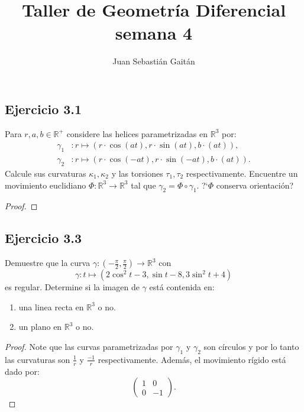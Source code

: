 \documentclass[12pt]{article}
\title{Taller de Geometr\'ia Diferencial semana 4 }
\author{Juan Sebasti\'an Gait\'an}
\begin{document}
\maketitle

\vspace{0.5in}



\subsection*{Ejercicio 3.1}
Para $r,a,b\in \mathbb{R}^{+}$  considere las helices parametrizadas en $\mathbb{R}^{3}$ por:
\begin{equation*}
\begin{split}
\gamma_{1}&: r \mapsto (r \cdot \cos (at), r \cdot \sin (at), b \cdot (at)), \\
\gamma_{2}&: r \mapsto (r \cdot \cos (-at), r \cdot \sin (-at) , b \cdot (at)).
\end{split}
\end{equation*}
Calcule sus curvaturas $\kappa_1 , \kappa_2 $ y las torsiones $\tau_1 , \tau_2$ respectivamente. Encuentre un movimiento euclidiano $\Phi: \mathbb{R}^3 \rightarrow \mathbb{R}^3$ tal que $\gamma_2=\Phi \circ \gamma_1$. ?`$\Phi$ conserva orientaci\'on?
\begin{proof}
\end{proof}



\subsection*{Ejercicio 3.3}
 Demuestre que la curva $\gamma :(-\frac{\pi}{2},\frac{\pi}{2}) \rightarrow \mathbb{R}^3$ con
\begin{equation*}
   \gamma :t \mapsto (2 \cos^2 t -3 , \sin t - 8 , 3 \sin ^2 t + 4)
\end{equation*}
es regular. Determine si la imagen de $\gamma$ est\'a contenida en:
\begin{enumerate}
  \item una linea recta en $\mathbb{R}^3$ o no.
  \item un plano en $\mathbb{R}^3$ o no.
\end{enumerate}


\begin{proof}
Note que las curvas parametrizadas por $\gamma_{1}$ y  $\gamma_{2}$ son c\'irculos y por lo tanto las curvaturas son $\frac{1}{r}$ y $\frac{-1}{r}$ respectivamente. Adem\'as, el movimiento r\'igido est\'a dado por:
\begin{equation*}
\begin{pmatrix} 1 & 0 \\ 0 & -1 \end{pmatrix}.
\end{equation*}
\end{proof}
\end{document}
